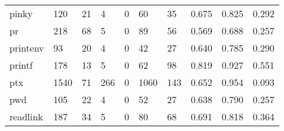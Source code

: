 \begin{longtable}{lp{1.3cm}p{1.3cm}p{1.3cm}p{1.3cm}p{1.3cm}p{1.3cm}p{1.3cm}p{1.3cm}p{1.3cm}}
pinky     &                    120 &                                 21 &                                 4 &                                0 &                                60 &                              35 &                                0.675 &                                  0.825 &                                0.292 \\
pr        &                    218 &                                 68 &                                 5 &                                0 &                                89 &                              56 &                                0.569 &                                  0.688 &                                0.257 \\
printenv  &                     93 &                                 20 &                                 4 &                                0 &                                42 &                              27 &                                0.640 &                                  0.785 &                                0.290 \\
printf    &                    178 &                                 13 &                                 5 &                                0 &                                62 &                              98 &                                0.819 &                                  0.927 &                                0.551 \\
ptx       &                   1540 &                                 71 &                               266 &                                0 &                              1060 &                             143 &                                0.652 &                                  0.954 &                                0.093 \\
pwd       &                    105 &                                 22 &                                 4 &                                0 &                                52 &                              27 &                                0.638 &                                  0.790 &                                0.257 \\
readlink  &                    187 &                                 34 &                                 5 &                                0 &                                80 &                              68 &                                0.691 &                                  0.818 &                                0.364 \\

\end{longtable}
